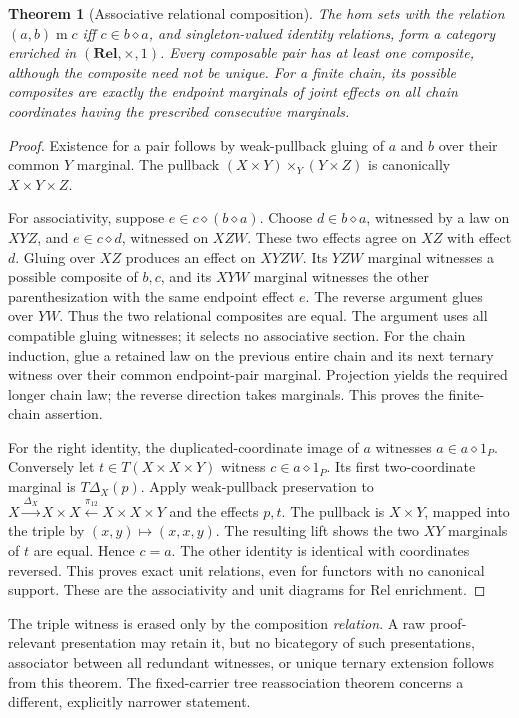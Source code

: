 \documentclass[11pt]{article}
\newtheorem{theorem}{Theorem}\newtheorem{proposition}{Proposition}
\begin{document}
\begin{theorem}[Associative relational composition]
The hom sets with the relation $(a,b)\mathrel{m}c$ iff $c\in b\diamond a$, and singleton-valued identity relations, form a category enriched in $(\mathbf{Rel},\times,1)$. Every composable pair has at least one composite, although the composite need not be unique. For a finite chain, its possible composites are exactly the endpoint marginals of joint effects on all chain coordinates having the prescribed consecutive marginals.
\end{theorem}
\begin{proof}
Existence for a pair follows by weak-pullback gluing of $a$ and $b$ over their common $Y$ marginal. The pullback $(X\times Y)\times_Y(Y\times Z)$ is canonically $X\times Y\times Z$.

For associativity, suppose $e\in c\diamond(b\diamond a)$. Choose $d\in b\diamond a$, witnessed by a law on $XYZ$, and $e\in c\diamond d$, witnessed on $XZW$. These two effects agree on $XZ$ with effect $d$. Gluing over $XZ$ produces an effect on $XYZW$. Its $YZW$ marginal witnesses a possible composite of $b,c$, and its $XYW$ marginal witnesses the other parenthesization with the same endpoint effect $e$. The reverse argument glues over $YW$. Thus the two relational composites are equal. The argument uses all compatible gluing witnesses; it selects no associative section. For the chain induction, glue a retained law on the previous entire chain and its next ternary witness over their common endpoint-pair marginal. Projection yields the required longer chain law; the reverse direction takes marginals. This proves the finite-chain assertion.

For the right identity, the duplicated-coordinate image of $a$ witnesses $a\in a\diamond1_P$. Conversely let $t\in T(X\times X\times Y)$ witness $c\in a\diamond1_P$. Its first two-coordinate marginal is $T\Delta_X(p)$. Apply weak-pullback preservation to $X\xrightarrow{\Delta_X}X\times X\xleftarrow{\pi_{12}}X\times X\times Y$ and the effects $p,t$. The pullback is $X\times Y$, mapped into the triple by $(x,y)\mapsto(x,x,y)$. The resulting lift shows the two $XY$ marginals of $t$ are equal. Hence $c=a$. The other identity is identical with coordinates reversed. This proves exact unit relations, even for functors with no canonical support. These are the associativity and unit diagrams for Rel enrichment.
\end{proof}

The triple witness is erased only by the composition \emph{relation}. A raw proof-relevant presentation may retain it, but no bicategory of such presentations, associator between all redundant witnesses, or unique ternary extension follows from this theorem. The fixed-carrier tree reassociation theorem concerns a different, explicitly narrower statement.
\end{document}
